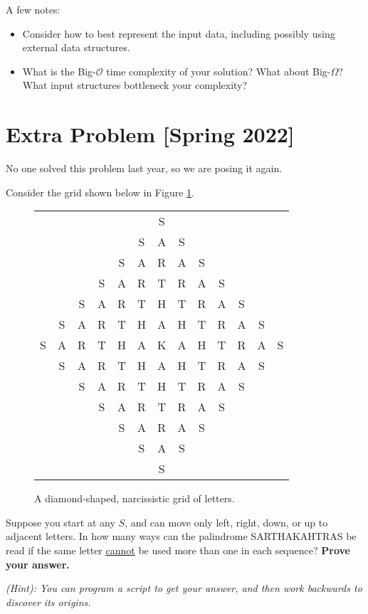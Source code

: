 \documentclass{article}
\begin{document}
    \vspace{2mm}
    A few notes:
    \begin{itemize}
        \item Consider how to best represent the input data, including possibly using external data structures.
        \item What is the Big-$\mathcal{O}$ time complexity of your solution? What about Big-$\Omega$? What input structures bottleneck your complexity?
    \end{itemize}

\pagebreak

\section*{Extra Problem [Spring 2022]}
    No one solved this problem last year, so we are posing it again.
    
    \vspace{2mm}
    Consider the grid shown below in Figure \ref*{E2}.
    
    \vspace{1mm}
    \setlength{\tabcolsep}{2.7pt}
    \begin{figure}[hbp]
        \centering
        \begin{tabular}{ccccccccccccc}
            & & & & & & S \\
            & & & & & S & A & S \\
            & & & & S & A & R & A & S \\
            & & & S & A & R & T & R & A & S \\
            & & S & A & R & T & H & T & R & A & S \\
            & S & A & R & T & H & A & H & T & R & A & S \\
            S & A & R & T & H & A & K & A & H & T & R & A & S \\
            & S & A & R & T & H & A & H & T & R & A & S \\
            & & S & A & R & T & H & T & R & A & S \\
            & & & S & A & R & T & R & A & S \\
            & & & & S & A & R & A & S \\
            & & & & & S & A & S \\
            & & & & & & S
        \end{tabular}
        \caption{A diamond-shaped, narcissistic grid of letters.}
        \label{E2}
    \end{figure}
    
    Suppose you start at any $S$, and can move only left, right, down, or up to adjacent letters. In how many ways can the palindrome SARTHAKAHTRAS be read if the same letter \underline{cannot} be used more than one in each sequence? \textbf{Prove your answer.}

    \vspace{2mm}
    \textit{(Hint): You can program a script to get your answer, and then work backwards to discover its origins.}
\end{document}

